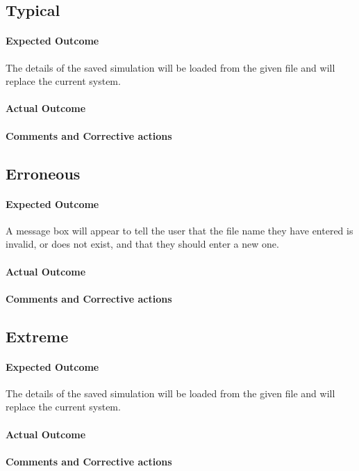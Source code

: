 \subsection{Typical}
\paragraph{Expected Outcome}
The details of the saved simulation will be loaded from the given file and will
replace the current system.
\paragraph{Actual Outcome}
\paragraph{Comments and Corrective actions}

\subsection{Erroneous}
\paragraph{Expected Outcome}
A message box will appear to tell the user that the file name they have entered
is invalid, or does not exist, and that they should enter a new one.
\paragraph{Actual Outcome}
\paragraph{Comments and Corrective actions}

\subsection{Extreme}
\paragraph{Expected Outcome}
The details of the saved simulation will be loaded from the given file and will
replace the current system.
\paragraph{Actual Outcome}
\paragraph{Comments and Corrective actions}


